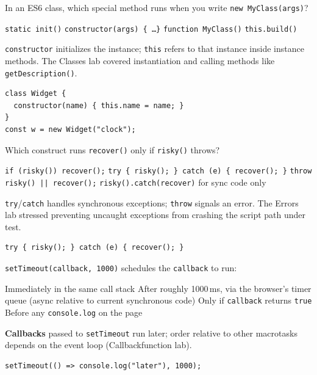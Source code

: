 \newpage


\question[4]
In an ES6 class, which special method runs when you write \texttt{new MyClass(args)}?
\begin{choices}
  \choice \texttt{static init()}
  \CorrectChoice \texttt{constructor(args) \{ \ldots \}}
  \choice \texttt{function MyClass()}
  \choice \texttt{this.build()}
\end{choices}
\begin{solution}
  \texttt{constructor} initializes the instance; \texttt{this} refers to that instance inside instance methods. The Classes lab covered instantiation and calling methods like \texttt{getDescription()}.
\begin{lstlisting}[style=jsexam]
class Widget {
  constructor(name) { this.name = name; }
}
const w = new Widget("clock");
\end{lstlisting}
\end{solution}

\question[4]
Which construct runs \texttt{recover()} only if \texttt{risky()} throws?
\begin{choices}
  \choice \texttt{if (risky()) recover();}
  \CorrectChoice \texttt{try \{ risky(); \} catch (e) \{ recover(); \}}
  \choice \texttt{throw risky() || recover();}
  \choice \texttt{risky().catch(recover)} for sync code only
\end{choices}
\begin{solution}
  \texttt{try}/\texttt{catch} handles synchronous exceptions; \texttt{throw} signals an error. The Errors lab stressed preventing uncaught exceptions from crashing the script path under test.
\begin{lstlisting}[style=jsexam]
try { risky(); } catch (e) { recover(); }
\end{lstlisting}
\end{solution}

\question[4]
\texttt{setTimeout(callback, 1000)} schedules the \texttt{callback} to run:
\begin{choices}
  \choice Immediately in the same call stack
  \CorrectChoice After roughly 1000\,ms, via the browser's timer queue (async relative to current synchronous code)
  \choice Only if \texttt{callback} returns \texttt{true}
  \choice Before any \texttt{console.log} on the page
\end{choices}
\begin{solution}
  \textbf{Callbacks} passed to \texttt{setTimeout} run later; order relative to other macrotasks depends on the event loop (Callbackfunction lab).
\begin{lstlisting}[style=jsexam]
setTimeout(() => console.log("later"), 1000);
\end{lstlisting}
\end{solution}

